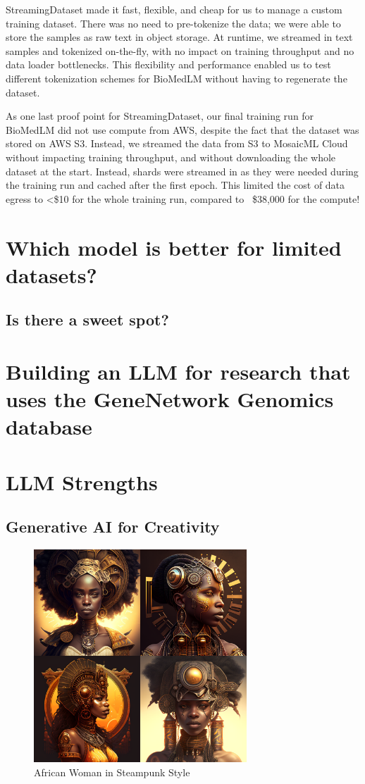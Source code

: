 \documentclass[letterpaper]{article}
\begin{document}
StreamingDataset made it fast, flexible, and cheap for us to manage a custom training dataset. 
There was no need to pre-tokenize the data; we were able to store the samples as raw text in object storage. 
At runtime, we streamed in text samples and tokenized on-the-fly, with no impact on training throughput and no data loader bottlenecks. 
This flexibility and performance enabled us to test different tokenization schemes for BioMedLM without having to regenerate the dataset.

As one last proof point for StreamingDataset, our final training run for BioMedLM did not use compute from AWS, despite the fact that the dataset was stored on AWS S3. 
Instead, we streamed the data from S3 to MosaicML Cloud without impacting training throughput, and without downloading the whole dataset at the start. 
Instead, shards were streamed in as they were needed during the training run and cached after the first epoch. 
This limited the cost of data egress to <\$10 for the whole training run, compared to ~\$38,000 for the compute!

\section{Which model is better for limited datasets?}
\subsection{Is there a sweet spot?}

\section{Building an LLM for research that uses the GeneNetwork Genomics database}

\section{LLM Strengths}
\subsection{Generative AI for Creativity}
\begin{figure}[ht]
\includegraphics[width=8cm]{imgs/African_Woman_Steampunk.eps}
\caption{African Woman in Steampunk Style}
\end{figure}
\end{document}

